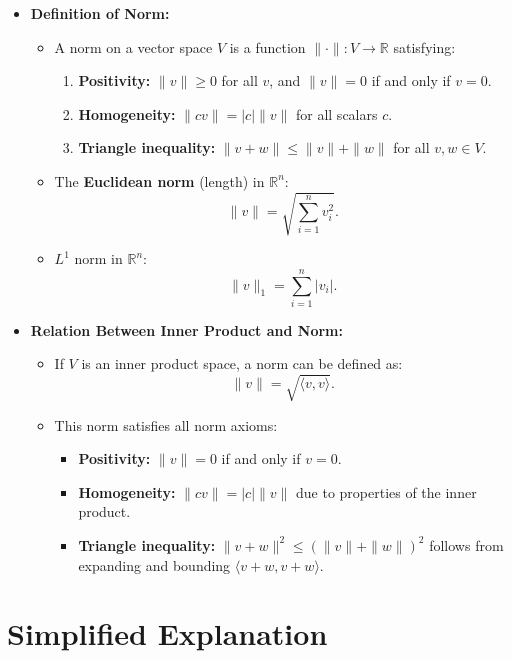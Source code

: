 \documentclass{article}
\begin{document}
\begin{itemize}
  \item \textbf{Definition of Norm:}
    \begin{itemize}
      \item A norm on a vector space $V$ is a function $\| \cdot \|: V \to \mathbb{R}$ satisfying:
        \begin{enumerate}
          \item \textbf{Positivity:} $\|v\| \geq 0$ for all $v$, and $\|v\| = 0$ if and only if $v = 0$.
          \item \textbf{Homogeneity:} $\|c v\| = |c| \|v\|$ for all scalars $c$.
          \item \textbf{Triangle inequality:} $\|v + w\| \leq \|v\| + \|w\|$ for all $v, w \in V$.
        \end{enumerate}
      \item The \textbf{Euclidean norm} (length) in $\mathbb{R}^n$:
        \[
          \|v\| = \sqrt{\sum_{i=1}^n v_i^2}.
        \]
      \item $L^1$ norm in $\mathbb{R}^n$:
        \[
          \|v\|_1 = \sum_{i=1}^n |v_i|.
        \]
    \end{itemize}

  \item \textbf{Relation Between Inner Product and Norm:}
    \begin{itemize}
      \item If $V$ is an inner product space, a norm can be defined as:
        \[
          \|v\| = \sqrt{\langle v, v \rangle}.
        \]
      \item This norm satisfies all norm axioms:
        \begin{itemize}
          \item \textbf{Positivity:} $\|v\| = 0$ if and only if $v = 0$.
          \item \textbf{Homogeneity:} $\|c v\| = |c| \|v\|$ due to properties of the inner product.
          \item \textbf{Triangle inequality:} $\|v + w\|^2 \leq (\|v\| + \|w\|)^2$ follows from expanding and bounding $\langle v + w, v + w \rangle$.
        \end{itemize}
    \end{itemize}
\end{itemize}

\section*{Simplified Explanation}
\end{document}
